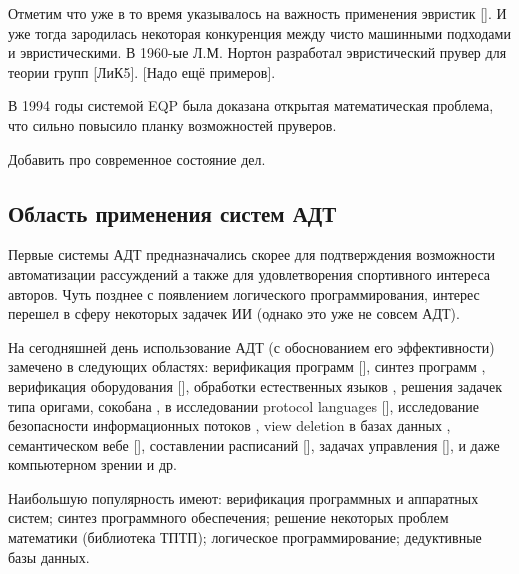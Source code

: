 Отметим что уже в то время указывалось на важность применения эвристик []. И уже тогда зародилась некоторая конкуренция между чисто машинными подходами и эвристическими. В 1960-ые Л.М. Нортон разработал эвристический прувер для теории групп [ЛиК5]. [Надо ещё примеров].

В 1994 годы системой EQP была доказана открытая математическая проблема, что сильно повысило планку возможностей пруверов.


Добавить про современное состояние дел.



\subsection{Область применения систем АДТ}
Первые системы АДТ предназначались скорее для подтверждения возможности автоматизации рассуждений а также для удовлетворения спортивного интереса авторов. Чуть позднее с появлением логического программирования, интерес перешел в сферу некоторых задачек ИИ (однако это уже не совсем АДТ).

На сегодняшней день использование АДТ (с обоснованием его эффективности) замечено в следующих областях: верификация программ [], синтез программ \cite{Butakov1}, верификация оборудования [], обработки естественных языков \cite{ATP_NLP}, решения задачек типа оригами, сокобана \cite{Origami}, в исследовании protocol languages [], исследование безопасности информационных потоков \cite{ATP_Flow}, view deletion в базах данных \cite{ATP_DB}, семантическом вебе [], составлении расписаний [], задачах управления [], и даже компьютерном зрении \cite{ATP_Vision} и др.

Наибольшую популярность имеют: верификация программных и аппаратных систем; синтез программного обеспечения; решение некоторых проблем математики (библиотека ТПТП); логическое программирование; дедуктивные базы данных.

